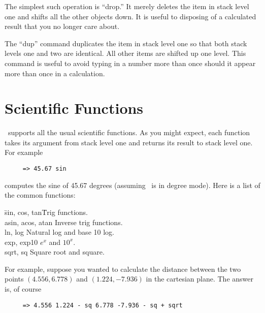 The simplest such operation is ``drop.'' It merely deletes the item in stack level one and
shifts all the other objects down. It is useful to disposing of a calculated result that you no
longer care about.

The ``dup'' command duplicates the item in stack level one so that both stack levels one and two
are identical. All other items are shifted up one level. This command is useful to avoid typing
in a number more than once should it appear more than once in a calculation.


\section{Scientific Functions}

\CLAC\ supports all the usual scientific functions. As you might expect, each function takes its
argument from stack level one and returns its result to stack level one. For example

\begin{verbatim}
     => 45.67 sin
\end{verbatim}

computes the sine of 45.67 degrees (assuming \CLAC\ is in degree mode). Here is a list of the
common functions:

\begin{tabbing}

\hspace*{3em}\=sin, cos, tan\hspace{5em}\=Trig functions.\\
\>             asin, acos, atan\>         Inverse trig functions.\\
\>             ln, log\>                  Natural log and base 10 log.\\
\>             exp, exp10\>               $e^{x}$ and $10^{x}$.\\
\>             sqrt, sq\>                 Square root and square.\\
\end{tabbing}

For example, suppose you wanted to calculate the distance between the two points $(4.556,
6.778)$ and $(1.224, -7.936)$ in the cartesian plane. The answer is, of course

\begin{verbatim}
     => 4.556 1.224 - sq 6.778 -7.936 - sq + sqrt
\end{verbatim}

